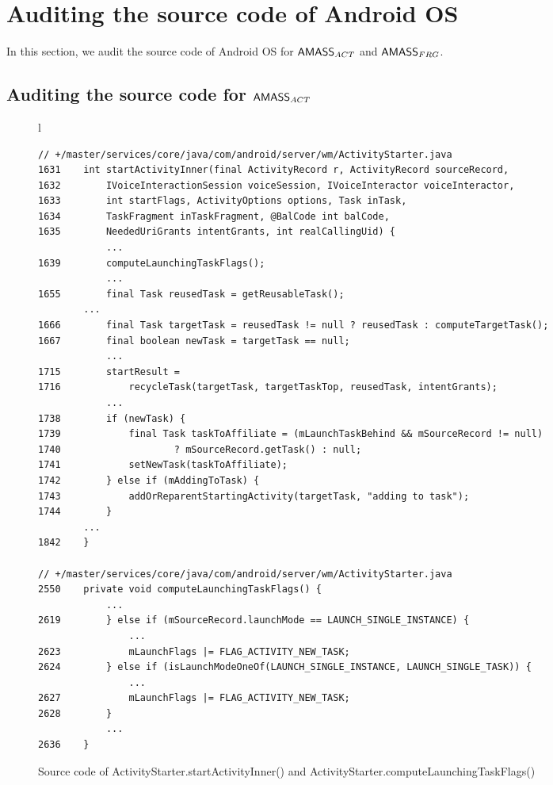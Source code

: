 \section{Auditing the source code of Android OS}\label{app:code-audit}

In this section, we audit the source code of Android OS for $\textsf{AMASS}_{ACT}$ and $\textsf{AMASS}_{FRG}$.

\subsection{Auditing the source code for $\textsf{AMASS}_{ACT}$}\label{app:code-audit-aomass}

\begin{figure}[htbp]
\centering
\begin{tabular*}{\linewidth}{l}
\begin{lstlisting}
// +/master/services/core/java/com/android/server/wm/ActivityStarter.java
1631    int startActivityInner(final ActivityRecord r, ActivityRecord sourceRecord,
1632        IVoiceInteractionSession voiceSession, IVoiceInteractor voiceInteractor,
1633        int startFlags, ActivityOptions options, Task inTask,
1634        TaskFragment inTaskFragment, @BalCode int balCode,
1635        NeededUriGrants intentGrants, int realCallingUid) {
            ...
1639        computeLaunchingTaskFlags();
            ...
1655	    final Task reusedTask = getReusableTask();
	    ...
1666        final Task targetTask = reusedTask != null ? reusedTask : computeTargetTask();
1667	    final boolean newTask = targetTask == null;
            ...
1715        startResult = 
1716            recycleTask(targetTask, targetTaskTop, reusedTask, intentGrants);
            ...
1738	    if (newTask) {
1739            final Task taskToAffiliate = (mLaunchTaskBehind && mSourceRecord != null)
1740                    ? mSourceRecord.getTask() : null;
1741            setNewTask(taskToAffiliate);
1742        } else if (mAddingToTask) {
1743            addOrReparentStartingActivity(targetTask, "adding to task");
1744        }
	    ...
1842    }

// +/master/services/core/java/com/android/server/wm/ActivityStarter.java
2550    private void computeLaunchingTaskFlags() {
            ...
2619        } else if (mSourceRecord.launchMode == LAUNCH_SINGLE_INSTANCE) {
                ...
2623            mLaunchFlags |= FLAG_ACTIVITY_NEW_TASK;
2624        } else if (isLaunchModeOneOf(LAUNCH_SINGLE_INSTANCE, LAUNCH_SINGLE_TASK)) {
                ...
2627            mLaunchFlags |= FLAG_ACTIVITY_NEW_TASK;
2628        }
            ...
2636    }
\end{lstlisting}
\end{tabular*}
\caption{Source code of ActivityStarter.startActivityInner() and ActivityStarter.computeLaunchingTaskFlags()}
\label{code-startActivityInner}
\end{figure}


